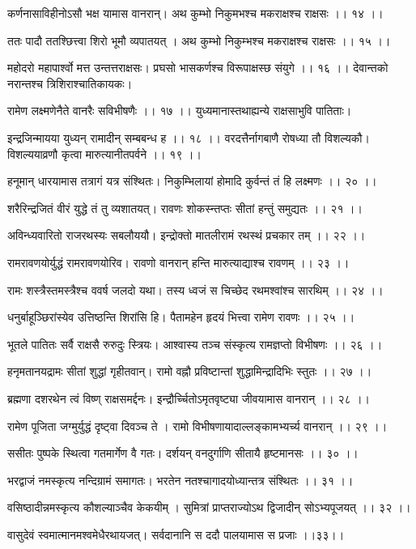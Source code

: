 कर्णनासाविहीनोऽसौ भक्ष यामास वानरान्।
अथ कुम्भो निकुमभश्च मकराक्षश्च राक्षसः ।। १४ ।।

ततः पादौ ततश्छित्त्वा शिरो भूमौ व्यपातयत् ।
अथ कुम्भो निकुम्भश्च मकराक्षश्च राक्षसः ।। १५ ।।

महोदरो महापार्श्वो मत्त उन्तत्तराक्षसः।
प्रघसो भासकर्णश्च विरूपाक्षस्छ संयुगे ।। १६ ।।
देवान्तको नरान्तश्च त्रिशिराश्चातिकायकः।

रामेण लक्ष्मणेनैते वानरैः सविभीषणैः ।। १७ ।।
युध्यमानास्तथाह्यन्ये राक्षसाभुवि पातिताः।

इन्द्रजिन्मायया युध्यन् रामादीन् सम्बबन्ध ह ।। १८ ।।
वरदत्तैर्नागबाणै रोषध्या तौ विशल्यकौ।
विशल्ययाव्रणौ कृत्वा मारुत्यानीतपर्वने ।। १९ ।।

हनूमान् धारयामास तत्रागं यत्र संश्थितः।
निकुम्भिलायां होमादि कुर्वन्तं तं हि लक्ष्मणः ।। २० ।।

शरैरिन्द्रजितं वीरं युद्धे तं तु व्यशातयत्।
रावणः शोकस्न्तप्तः सीतां हन्तुं समुद्यतः ।। २१ ।।

अविन्ध्यवारितो राजरथस्यः सबलौययौ।
इन्द्रोक्तो मातलीरामं रथस्थं प्रचकार तम् ।। २२ ।।

रामरावणयोर्युद्धं रामरावणयोरिव।
रावणो वानरान् हन्ति मारुत्याद्याश्च रावणम् ।। २३ ।।

रामः शस्त्रैस्तमस्त्रैश्च ववर्ष जलदो यथा।
तस्य ध्वजं स चिच्छेद रथमश्वांश्च सारथिम् ।। २४ ।।

धनुर्बाहूञ्छिरांस्येव उत्तिष्ठन्ति शिरांसि हि।
पैतामहेन हृदयं भित्त्वा रामेण रावणः ।। २५ ।।

भूतले पातितः सर्वै राक्षसै रुरुदुः स्त्रियः।
आश्वास्य तञ्च संस्कृत्य रामज्ञप्तो विभीषणः ।। २६ ।।

हनृमतानयद्रामः सीतां शुद्धां गृहीतवान्।
रामो वह्नौ प्रविष्टान्तां शुद्धामिन्द्रादिभिः स्तुतः ।। २७ ।।

ब्रह्मणा दशरथेन त्वं विष्ण् राक्षसमर्द्दनः।
इन्द्रौर्च्चितोऽमृतवृष्ट्या जीवयामास वानरान् ।। २८ ।।

रामेण पूजिता जग्मुर्युद्धं दृष्ट्वा दिवञ्च ते ।
रामो विभीषणायादाल्लङ्कामभ्यर्च्य वानरान् ।। २९ ।।

ससीतः पुष्पके स्थित्वा गतमार्गेण वै गतः।
दर्शयन् वनदुर्गाणि सीतायै हृष्टमानसः ।। ३० ।।

भरद्वाजं नमस्कृत्य नन्दिग्रामं समागतः।
भरतेन नतश्चागादयोध्यान्तत्र संश्थितः ।। ३१ ।।

वसिष्ठादीन्नमस्कृत्य कौशल्याञ्चैव केकयीम् ।
सुमित्रां प्राप्तराज्योऽथ द्विजादीन् सोऽभ्यपूजयत् ।। ३२ ।।

वासुदेवं स्वमात्मानमश्वमेधैरथायजत्।
सर्वदानानि स ददौ पालयामास स प्रजाः ।।३३।।

